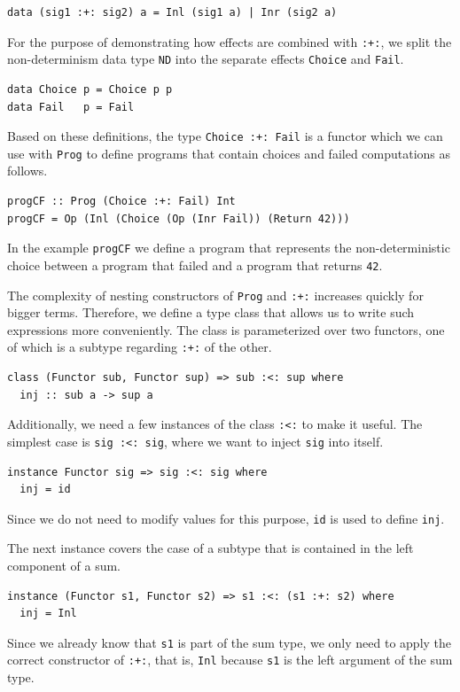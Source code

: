 \documentclass[a4paper, 11pt, fleqn, twoside, abstract=on]{scrreprt}
\newcommand{\hinl}[1]{\texttt{#1}}
\newcommand{\cinl}[1]{\texttt{#1}}
\begin{document}
\begin{verbatim}
data (sig1 :+: sig2) a = Inl (sig1 a) | Inr (sig2 a)
\end{verbatim}
\noindent
For the purpose of demonstrating how effects are combined with \cinl{:+:}, we split the non-determinism data type \hinl{ND} into the separate effects \hinl{Choice} and \hinl{Fail}.

\begin{verbatim}
data Choice p = Choice p p
data Fail   p = Fail
\end{verbatim}
\noindent
Based on these definitions, the type \hinl{Choice :+: Fail} is a functor which we can use with \hinl{Prog} to define programs that contain choices and failed computations as follows.

\begin{verbatim}
progCF :: Prog (Choice :+: Fail) Int
progCF = Op (Inl (Choice (Op (Inr Fail)) (Return 42)))
\end{verbatim}
\noindent
In the example \hinl{progCF} we define a program that represents the non-deterministic choice between a program that failed and a program that returns \hinl{42}.

The complexity of nesting constructors of \hinl{Prog} and \hinl{:+:} increases quickly for bigger terms.
Therefore, we define a type class that allows us to write such expressions more conveniently.
The class is parameterized over two functors, one of which is a subtype regarding \hinl{:+:} of the other.

\begin{verbatim}
class (Functor sub, Functor sup) => sub :<: sup where
  inj :: sub a -> sup a
\end{verbatim}
\noindent
Additionally, we need a few instances of the class \hinl{:<:} to make it useful.
The simplest case is \hinl{sig :<: sig}, where we want to inject \hinl{sig} into itself.

\begin{verbatim}
instance Functor sig => sig :<: sig where
  inj = id  
\end{verbatim}
\noindent
Since we do not need to modify values for this purpose, \hinl{id} is used to define \hinl{inj}.

The next instance covers the case of a subtype that is contained in the left component of a sum.

\begin{verbatim}
instance (Functor s1, Functor s2) => s1 :<: (s1 :+: s2) where
  inj = Inl
\end{verbatim}
\noindent
Since we already know that \hinl{s1} is part of the sum type, we only need to apply the correct constructor of \hinl{:+:}, that is, \hinl{Inl} because \hinl{s1} is the left argument of the sum type.
\end{document}
